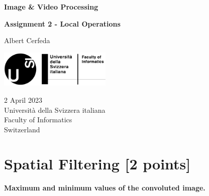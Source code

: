 \documentclass[tikz,14pt,fleqn]{article}
\newcommand\namesurname{Albert Cerfeda}
\newcommand\assignment{Assignment 2 - Local Operations}
\newcommand\subject{Image \& Video Processing}
\newcommand\documentdate{2 April 2023}
\begin{document}
\begin{titlepage}
   \begin{center}
       \vspace*{0.2cm}

       \textbf{\Large{\subject}}

       \vspace{0.5cm}
        \textbf{\assignment}\\[5mm]
        
            
       \vspace{0.4cm}

        \namesurname
        \begin{figure}[H]
            \centering
        \end{figure}
       \tableofcontents

       \vspace*{\fill}
     
        \includegraphics[width=0.4\textwidth]{fig/logo.png}
       
        \documentdate \\
        Università della Svizzera italiana\\
        Faculty of Informatics\\
        Switzerland\\

   \end{center}
\end{titlepage}

\section{Spatial Filtering [2 points]}

\textbf{Maximum and minimum values of the convoluted image.}
\end{document}
